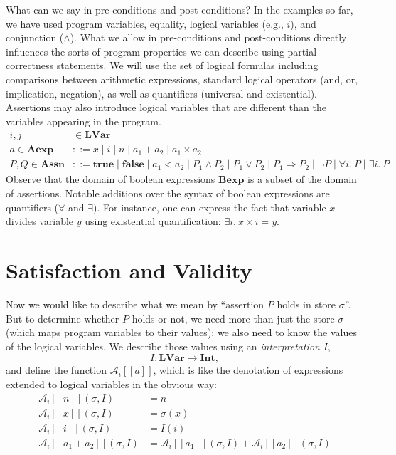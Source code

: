 What can we say in pre-conditions and post-conditions? In the examples so far, we have used
program variables, equality, logical variables (e.g., $i$), and conjunction ($\wedge$). What we
allow in pre-conditions and post-conditions directly influences the sorts of program properties
we can describe using partial correctness statements. We will use the set of logical formulas
including comparisons between arithmetic expressions, standard logical operators (and, or,
implication, negation), as well as quantifiers (universal and existential). Assertions may also
introduce logical variables that are different than the variables appearing in the program.
\begin{align*}
i, j &\in \mathbf{LVar} \\
a \in \mathbf{Aexp} &::= x \mid i \mid n \mid a_1 + a_2 \mid a_1 \times a_2 \\
P, Q \in \mathbf{Assn} &::= \mathbf{true} \mid \mathbf{false} \mid a_1 < a_2 \mid P_1 \wedge
P_2 \mid P_1 \vee P_2 \mid P_1 \Rightarrow P_2 \mid \neg P \mid \forall i.\ P \mid \exists i.\ P
\end{align*}
Observe that the domain of boolean expressions $\mathbf{Bexp}$ is a subset of the domain of
assertions. Notable additions over the syntax of boolean expressions are quantifiers ($\forall$
and $\exists$). For instance, one can express the fact that variable $x$ divides variable $y$
using existential quantification: $\exists i.\ x \times i = y$.

\section{Satisfaction and Validity}

Now we would like to describe what we mean by ``assertion $P$ holds in store $\sigma$''. But to
determine whether $P$ holds or not, we need more than just the store $\sigma$ (which maps
program variables to their values); we also need to know the values of the logical variables.
We describe those values using an \emph{interpretation} $I$,
\[
I : \mathbf{LVar} \to \mathbf{Int},
\]
and define the function $\mathcal{A}_i[\![a]\!]$, which is like the denotation of expressions
extended to logical variables in the obvious way:
\begin{align*}
\mathcal{A}_i[\![n]\!](\sigma, I) &= n \\
\mathcal{A}_i[\![x]\!](\sigma, I) &= \sigma(x) \\
\mathcal{A}_i[\![i]\!](\sigma, I) &= I(i) \\
\mathcal{A}_i[\![a_1 + a_2]\!](\sigma, I) &= \mathcal{A}_i[\![a_1]\!](\sigma, I) +
\mathcal{A}_i[\![a_2]\!](\sigma, I)
\end{align*}

